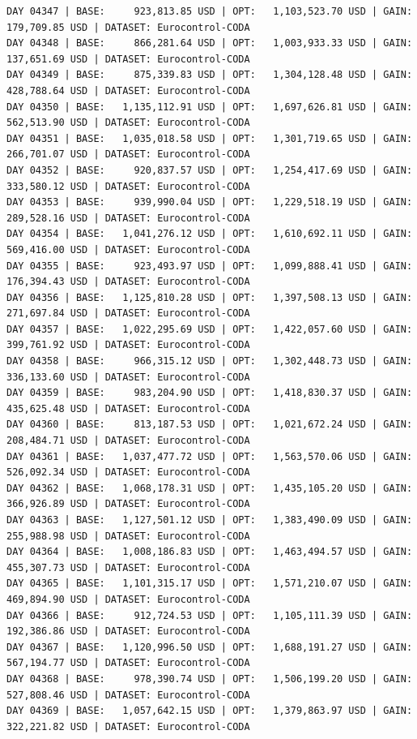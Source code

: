 \documentclass[11pt,a4paper]{article}
\begin{document}
\begin{verbatim}
DAY 04347 | BASE:     923,813.85 USD | OPT:   1,103,523.70 USD | GAIN: 179,709.85 USD | DATASET: Eurocontrol-CODA
DAY 04348 | BASE:     866,281.64 USD | OPT:   1,003,933.33 USD | GAIN: 137,651.69 USD | DATASET: Eurocontrol-CODA
DAY 04349 | BASE:     875,339.83 USD | OPT:   1,304,128.48 USD | GAIN: 428,788.64 USD | DATASET: Eurocontrol-CODA
DAY 04350 | BASE:   1,135,112.91 USD | OPT:   1,697,626.81 USD | GAIN: 562,513.90 USD | DATASET: Eurocontrol-CODA
DAY 04351 | BASE:   1,035,018.58 USD | OPT:   1,301,719.65 USD | GAIN: 266,701.07 USD | DATASET: Eurocontrol-CODA
DAY 04352 | BASE:     920,837.57 USD | OPT:   1,254,417.69 USD | GAIN: 333,580.12 USD | DATASET: Eurocontrol-CODA
DAY 04353 | BASE:     939,990.04 USD | OPT:   1,229,518.19 USD | GAIN: 289,528.16 USD | DATASET: Eurocontrol-CODA
DAY 04354 | BASE:   1,041,276.12 USD | OPT:   1,610,692.11 USD | GAIN: 569,416.00 USD | DATASET: Eurocontrol-CODA
DAY 04355 | BASE:     923,493.97 USD | OPT:   1,099,888.41 USD | GAIN: 176,394.43 USD | DATASET: Eurocontrol-CODA
DAY 04356 | BASE:   1,125,810.28 USD | OPT:   1,397,508.13 USD | GAIN: 271,697.84 USD | DATASET: Eurocontrol-CODA
DAY 04357 | BASE:   1,022,295.69 USD | OPT:   1,422,057.60 USD | GAIN: 399,761.92 USD | DATASET: Eurocontrol-CODA
DAY 04358 | BASE:     966,315.12 USD | OPT:   1,302,448.73 USD | GAIN: 336,133.60 USD | DATASET: Eurocontrol-CODA
DAY 04359 | BASE:     983,204.90 USD | OPT:   1,418,830.37 USD | GAIN: 435,625.48 USD | DATASET: Eurocontrol-CODA
DAY 04360 | BASE:     813,187.53 USD | OPT:   1,021,672.24 USD | GAIN: 208,484.71 USD | DATASET: Eurocontrol-CODA
DAY 04361 | BASE:   1,037,477.72 USD | OPT:   1,563,570.06 USD | GAIN: 526,092.34 USD | DATASET: Eurocontrol-CODA
DAY 04362 | BASE:   1,068,178.31 USD | OPT:   1,435,105.20 USD | GAIN: 366,926.89 USD | DATASET: Eurocontrol-CODA
DAY 04363 | BASE:   1,127,501.12 USD | OPT:   1,383,490.09 USD | GAIN: 255,988.98 USD | DATASET: Eurocontrol-CODA
DAY 04364 | BASE:   1,008,186.83 USD | OPT:   1,463,494.57 USD | GAIN: 455,307.73 USD | DATASET: Eurocontrol-CODA
DAY 04365 | BASE:   1,101,315.17 USD | OPT:   1,571,210.07 USD | GAIN: 469,894.90 USD | DATASET: Eurocontrol-CODA
DAY 04366 | BASE:     912,724.53 USD | OPT:   1,105,111.39 USD | GAIN: 192,386.86 USD | DATASET: Eurocontrol-CODA
DAY 04367 | BASE:   1,120,996.50 USD | OPT:   1,688,191.27 USD | GAIN: 567,194.77 USD | DATASET: Eurocontrol-CODA
DAY 04368 | BASE:     978,390.74 USD | OPT:   1,506,199.20 USD | GAIN: 527,808.46 USD | DATASET: Eurocontrol-CODA
DAY 04369 | BASE:   1,057,642.15 USD | OPT:   1,379,863.97 USD | GAIN: 322,221.82 USD | DATASET: Eurocontrol-CODA

\end{verbatim}
\end{document}
